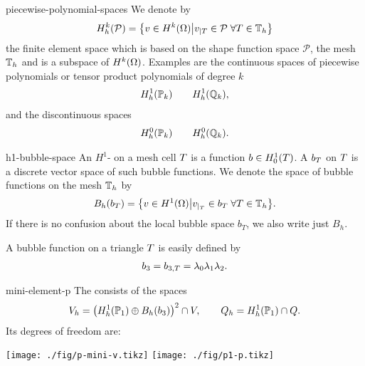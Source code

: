 \begin{Notation}{piecewise-polynomial-spaces}
  We denote by
  \begin{gather}
    \label{eq:stokes:8}
    H^k_h(\mathcal P) =
    \bigl\{ v\in H^k(\Omega) \big\vert
    v_{|\cell} \in \mathcal P \;\forall \cell\in\mesh_h\bigr\}
  \end{gather}
  the finite element space which is based on the shape function space
  $\mathcal P$, the mesh $\mesh_h$ and is a subspace of
  $H^k(\domain)$. Examples are the continuous spaces of piecewise
  polynomials or tensor product polynomials of degree $k$
  \begin{gather*}
    H^1_h(\P_k) \qquad H^1_h(\Q_k),
  \end{gather*}
  and the discontinuous spaces
  \begin{gather*}
    H^0_h(\P_k) \qquad H^0_h(\Q_k).
  \end{gather*}
\end{Notation}

\begin{Definition}{h1-bubble-space}
  An $H^1$- on a mesh cell $\cell$ is a
  function $b\in H^1_0(\cell)$. A  $b_\cell$ on
  $\cell$ is a discrete vector space of such bubble functions.  We
  denote the space of bubble functions on the mesh $\mesh_h$ by
  \begin{gather*}
    B_h(b_\cell) = \bigl\{ v\in H^1(\domain) \big\vert
    v_{|_\cell} \in b_\cell \;\forall \cell\in\mesh_h
    \bigr\}.
  \end{gather*}
  If there is no confusion about the local bubble space $b_T$, we also
  write just $B_h$.
\end{Definition}

\begin{example}
  A bubble function on a triangle $\cell$ is easily defined by
  \begin{gather}
    \label{eq:stokes:7}
    b_3 = b_{3,\cell} = \lambda_0\lambda_1\lambda_2.
  \end{gather}
\end{example}

\begin{Definition}{mini-element-p}
  The  consists of the spaces
  \begin{gather}
    V_h = \bigl(H^1_h(\P_1) \oplus B_h(b_3)\bigr)^2 \cap V,
    \qquad
    Q_h = H^1_h(\P_1) \cap Q.
  \end{gather}
  Its degrees of freedom are:
  \begin{center}
    \texttt{[image: ./fig/p-mini-v.tikz]}
    \hspace{1cm}
    \texttt{[image: ./fig/p1-p.tikz]}
  \end{center}
\end{Definition}

